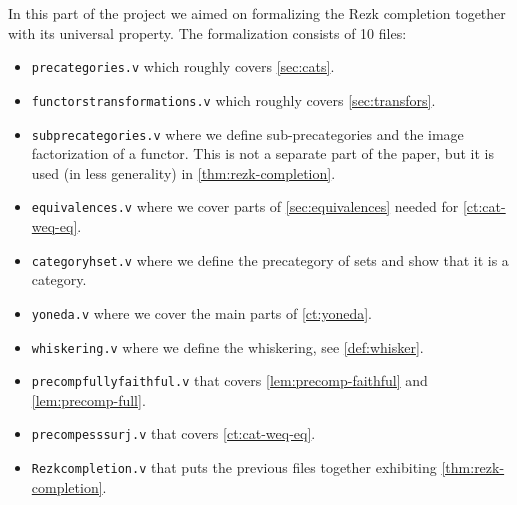 In this part of the project we aimed on formalizing the Rezk completion together with its universal property. The formalization consists of 10 files:
\begin{itemize}
 \item \texttt{precategories.v} which roughly covers \autoref{sec:cats}.
 \item \texttt{functors\textunderscore transformations.v} which roughly covers \autoref{sec:transfors}.
 \item \texttt{sub\textunderscore precategories.v} where we define sub-precategories and
                 the image factorization of a functor. 
          This is not a separate part of the paper, but it is used (in less generality) in \autoref{thm:rezk-completion}.
 \item \texttt{equivalences.v} where we cover parts of \autoref{sec:equivalences} needed for \autoref{ct:cat-weq-eq}.
 \item \texttt{category\textunderscore hset.v} where we define the precategory of sets and show that it is a category.
 \item \texttt{yoneda.v} where we cover the main parts of \autoref{ct:yoneda}.
 \item \texttt{whiskering.v} where we define the whiskering, see \autoref{def:whisker}.
 \item \texttt{precomp\textunderscore fully\textunderscore faithful.v} that covers \autoref{lem:precomp-faithful} and \ref{lem:precomp-full}.
 \item \texttt{precomp\textunderscore ess\textunderscore surj.v} that covers \autoref{ct:cat-weq-eq}.
 \item \texttt{Rezk\textunderscore completion.v} that puts the previous files together exhibiting \autoref{thm:rezk-completion}.
\end{itemize}






